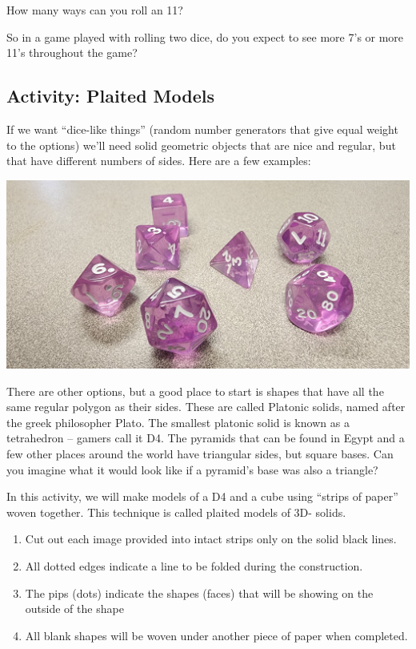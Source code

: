 How many ways can you roll an 11?

\wbvfill

So in a game played with rolling two dice, do you expect to see more  7's or more 11's throughout the game?

\wbvfill


\wbnewpage

\subsection{Activity: Plaited Models}
If we want ``dice-like things'' (random number generators that give equal weight to the options) we'll need solid geometric objects that are nice and regular, but that have different numbers of sides.  Here are a few examples:

\centerline{\includegraphics[scale=.1]{images/fancy_dice.jpg}}
\bigskip

There are other options, but a good place to start is shapes that have all the same regular polygon as their sides. These are called Platonic solids, named after the greek philosopher Plato. The smallest platonic solid is known as a tetrahedron -- gamers call it D4. The pyramids that can be found in Egypt and a few other places around the world have triangular sides, but square bases.  Can you imagine what it would look like if a pyramid's base was also a triangle?

\bigskip

In this activity, we will make models of a D4 and a cube using ``strips of paper'' woven together. This technique is called plaited models of $3$D- solids.
\begin{enumerate}
\item Cut out each image provided into intact strips only on the solid black lines.
\item All dotted edges indicate a line to be folded during the construction. 
\item The pips (dots) indicate the shapes (faces) that will be showing on the outside of the shape
\item All blank shapes will be woven under another piece of paper when completed.
\end{enumerate}

